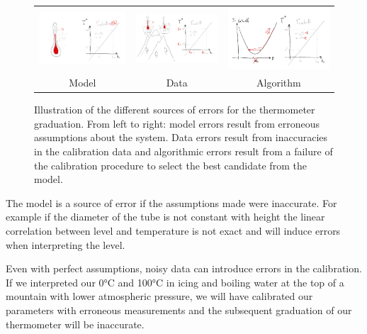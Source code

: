 \begin{bibunit}
\begin{figure}
\begin{tabular}{c |c|c}
     \hspace{-.15\linewidth}\includegraphics[width=.4\linewidth]{Introduction/pics/model_err_w_source.png}  &
     \includegraphics[width=.4\linewidth]{Introduction/pics/data_err_w_source.png} &
     \includegraphics[width=.4\linewidth]{Introduction/pics/optim_err_w_source.png} \\
     \hspace{-.15\linewidth}Model &  Data &  Algorithm \\
\end{tabular}
    \centering
    \caption{Illustration of the different sources of errors for the thermometer graduation. From left to right: model errors result from erroneous assumptions about the system. Data errors result from inaccuracies in the calibration data and algorithmic errors result from a failure of the calibration procedure to select the best candidate from the model.}
    \label{fig:err_sources}
\end{figure}
 The model is a source of error if the assumptions made were inaccurate. For example if the diameter of the tube is not constant with height the linear correlation between level and temperature is not exact and will induce errors when interpreting the level.

 Even with perfect assumptions, noisy data can introduce errors in the calibration. If we interpreted our 0°C and 100°C in icing and boiling water at the top of a mountain with lower atmospheric pressure, we will have calibrated our parameters with erroneous measurements and the subsequent graduation of our thermometer will be inaccurate.


\end{bibunit}
